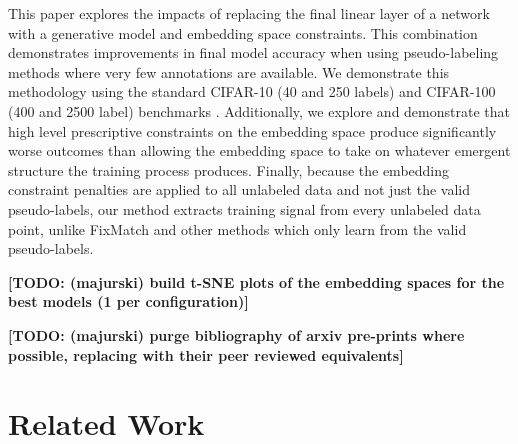 \documentclass[10pt,twocolumn,letterpaper]{article}
\newcommand{\TODO}[1]{\textbf{\color{red}[TODO: #1]}}
\begin{document}
This paper explores the impacts of replacing the final linear layer of a network with a generative model and embedding space constraints.
This combination demonstrates improvements in final model accuracy when using pseudo-labeling methods where very few annotations are available.
We demonstrate this methodology using the standard CIFAR-10 (40 and 250 labels) and CIFAR-100 (400 and 2500 label) benchmarks \cite{cifar10}. 
Additionally, we explore and demonstrate that high level prescriptive constraints on the embedding space produce significantly worse outcomes than allowing the embedding space to take on whatever emergent structure the training process produces. 
Finally, because the embedding constraint penalties are applied to all unlabeled data and not just the valid pseudo-labels, our method extracts training signal from every unlabeled data point, unlike FixMatch \cite{sohn2020fixmatch} and other methods which only learn from the valid pseudo-labels.




\TODO {(majurski) build t-SNE plots of the embedding spaces for the best models (1 per configuration)}

\TODO {(majurski) purge bibliography of arxiv pre-prints where possible, replacing with their peer reviewed equivalents}





\section{Related Work}
\end{document}
